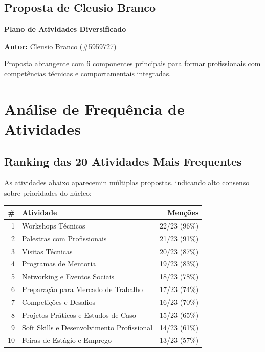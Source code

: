 \documentclass[12pt,a4paper,oneside]{article}
\begin{document}
\vspace{1.5cm}

\subsection{Proposta de Cleusio Branco}

\noindent\colorbox{caixa-verde}{%
\begin{minipage}{\textwidth}

\textbf{\color{spe-primary}Plano de Atividades Diversificado}

\medskip

\textbf{Autor:} Cleusio Branco (\#5959727)

\medskip

Proposta abrangente com 6 componentes principais para formar profissionais com competências técnicas e comportamentais integradas.

\end{minipage}%
}


\newpage

\section{Análise de Frequência de Atividades}

\subsection{Ranking das 20 Atividades Mais Frequentes}

As atividades abaixo aparecemin múltiplas propostas, indicando alto consenso sobre prioridades do núcleo:

\vspace{1cm}

{\small
\begin{tabular}{|r|l|r|}
\hline
\textbf{\#} & \textbf{Atividade} & \textbf{Menções} \\
\hline
\cellcolor{spe-light}1 & Workshops Técnicos & 22/23 (96\%) \\
\hline
\cellcolor{spe-light}2 & Palestras com Profissionais & 21/23 (91\%) \\
\hline
\cellcolor{spe-light}3 & Visitas Técnicas & 20/23 (87\%) \\
\hline
4 & Programas de Mentoria & 19/23 (83\%) \\
\hline
5 & Networking e Eventos Sociais & 18/23 (78\%) \\
\hline
6 & Preparação para Mercado de Trabalho & 17/23 (74\%) \\
\hline
7 & Competições e Desafios & 16/23 (70\%) \\
\hline
8 & Projetos Práticos e Estudos de Caso & 15/23 (65\%) \\
\hline
9 & Soft Skills e Desenvolvimento Profissional & 14/23 (61\%) \\
\hline
10 & Feiras de Estágio e Emprego & 13/23 (57\%) \\
\hline
\end{tabular}
}
\end{document}
